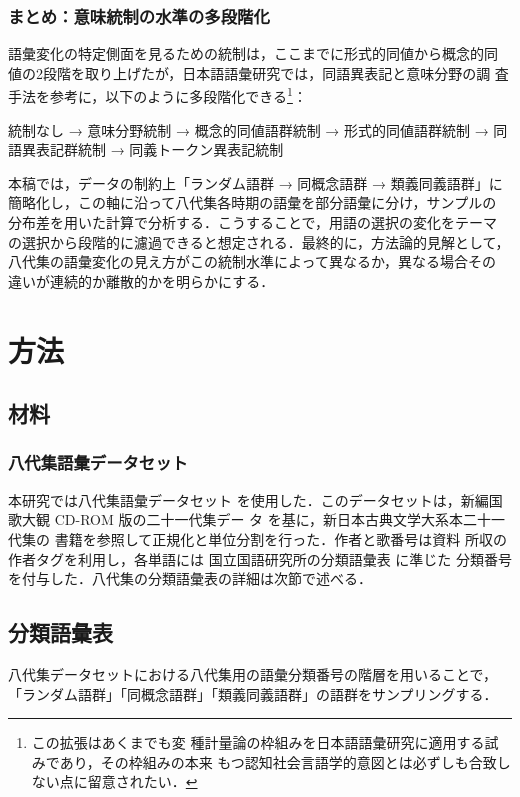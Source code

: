 \documentclass[submit]{ipsj}
\begin{document}
\subsubsection{まとめ：意味統制の水準の多段階化}
\label{sec:org5b836f6}
語彙変化の特定側面を見るための統制は，ここまでに形式的同値から概念的同
値の2段階を取り上げたが，日本語語彙研究では，同語異表記と意味分野の調
査手法を参考に，以下のように多段階化できる\footnote{この拡張はあくまでも変
種計量論の枠組みを日本語語彙研究に適用する試みであり，その枠組みの本来
もつ認知社会言語学的意図とは必ずしも合致しない点に留意されたい．}：

統制なし → 意味分野統制 → 概念的同値語群統制 → 形式的同値語群統制 → 同
語異表記群統制 → 同義トークン異表記統制

本稿では，データの制約上「ランダム語群 → 同概念語群 → 類義同義語群」に
簡略化し，この軸に沿って八代集各時期の語彙を部分語彙に分け，サンプルの
分布差を用いた計算で分析する．こうすることで，用語の選択の変化をテーマ
の選択から段階的に濾過できると想定される．最終的に，方法論的見解として，
八代集の語彙変化の見え方がこの統制水準によって異なるか，異なる場合その
違いが連続的か離散的かを明らかにする．
\section{方法\label{org1d3cf0a}}
\label{sec:orgc930e15}
\subsection{材料\label{orgf5e136d}}
\label{sec:orgf6426ad}
\subsubsection{八代集語彙データセット\label{org9a37af0}}
\label{sec:org86b04c3}
本研究では八代集語彙データセット \cite{Hodoscek2022Developmenta}
を使用した．このデータセットは，新編国歌大観 CD-ROM 版の二十一代集デー
タ\cite{shinhen1996CDROM} を基に，新日本古典文学大系本二十一代集の
書籍を参照して正規化と単位分割を行った．作者と歌番号は資料
\cite{nakamura1999Kokubungaku} 所収の作者タグを利用し，各単語には
国立国語研究所の分類語彙表 \cite{nakano1994Bunruigoihyo} に準じた
分類番号を付与した．八代集の分類語彙表の詳細は次節で述べる．
\subsection{分類語彙表\label{org717eb2e}}
\label{sec:org85fa932}
八代集データセットにおける八代集用の語彙分類番号の階層を用いることで，
「ランダム語群」「同概念語群」「類義同義語群」の語群をサンプリングする．
\end{document}
